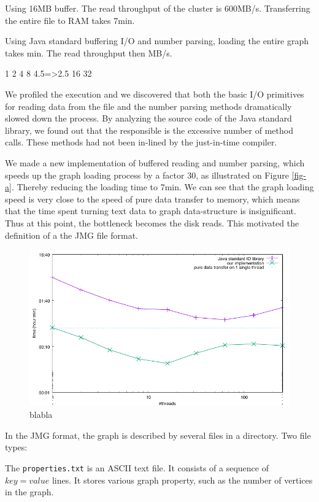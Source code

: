 \documentclass[11pt,a4paper]{article}
\begin{document}
Using 16MB buffer.
The read throughput of the cluster is 600MB/s. Transferring the entire file to RAM takes 7min.

Using Java standard buffering I/O and number parsing, loading the entire graph takes min. The read throughput then MB/s.

1
2
4
8		4.5=>2.5
16
32

We profiled the execution and we discovered that both  the  basic I/O primitives for reading data from the file and the number parsing methods dramatically slowed down the process. By analyzing the source code of the Java standard library, we found out that the responsible is the excessive number of method calls. These methods had not been in-lined by the just-in-time compiler.

We made a new implementation of buffered reading and number parsing, which speeds up the graph loading process by a factor 30, as illustrated on Figure \ref{fig-a}. Thereby reducing the loading time to 7min. We can see that the graph loading speed is very close to the speed of pure data transfer to memory, which means that the time spent turning text data to graph data-structure is insignificant. Thus at this point, the bottleneck becomes the disk reads. This motivated the definition of a the JMG file format.


\begin{figure}
\begin{center}
\includegraphics[width=0.8\linewidth]{load.pdf}
\end{center}
\caption{blabla}
\end{figure}

In the JMG format, the graph is described by several files in a directory. Two file types:

The \texttt{properties.txt}  is an ASCII text file. It consists of a sequence of $key=value$ lines. It stores various graph property, such as the number of vertices in the graph.
\end{document}
